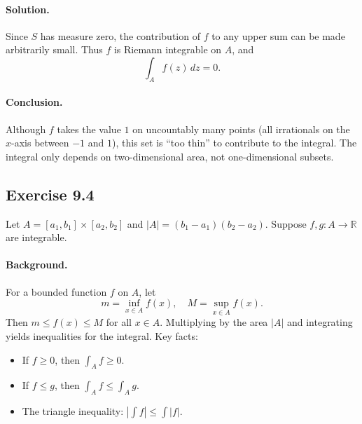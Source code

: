 \documentclass[11pt,a4paper]{article}
\begin{document}
\paragraph{Solution.}
Since $S$ has measure zero, the contribution of $f$ to any upper sum can be made arbitrarily small. 
Thus $f$ is Riemann integrable on $A$, and
\[
\int_A f(z)\,dz=0.
\]

\paragraph{Conclusion.}
Although $f$ takes the value $1$ on uncountably many points (all irrationals on the $x$-axis between $-1$ and $1$), this set is “too thin” to contribute to the integral. The integral only depends on two-dimensional area, not one-dimensional subsets.

\subsection*{Exercise 9.4}

Let $A=[a_1,b_1]\times[a_2,b_2]$ and $|A|=(b_1-a_1)(b_2-a_2)$.  
Suppose $f,g:A\to\mathbb{R}$ are integrable.

\paragraph{Background.}
For a bounded function $f$ on $A$, let
\[
m=\inf_{x\in A} f(x), \quad M=\sup_{x\in A} f(x).
\]
Then $m\leq f(x)\leq M$ for all $x\in A$. Multiplying by the area $|A|$ and integrating yields inequalities for the integral.  
Key facts:
\begin{itemize}
	\item If $f\geq 0$, then $\int_A f\geq 0$.
	\item If $f\leq g$, then $\int_A f\leq \int_A g$.
	\item The triangle inequality: $\left|\int f\right|\leq \int |f|$.
\end{itemize}
\end{document}
